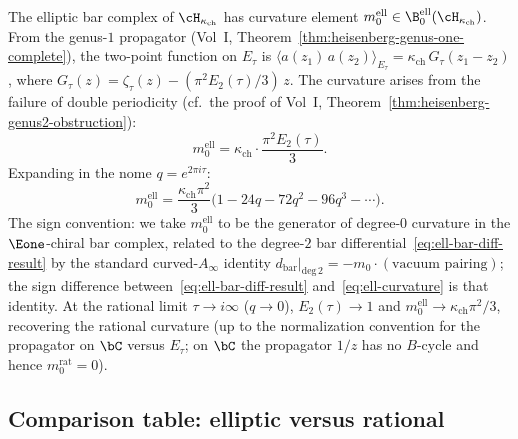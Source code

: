 \begin{computation}\label{comp:ell-curvature}
The elliptic bar complex of $\cH_{\kappa_{\mathrm{ch}}}$ has curvature
element $m_0^{\mathrm{ell}} \in \B^{\mathrm{ell}}_0(\cH_{\kappa_{\mathrm{ch}}})$.
From the genus-$1$ propagator
(Vol~I, Theorem~\ref{thm:heisenberg-genus-one-complete}), the
two-point function on $E_\tau$ is $\langle a(z_1)\,a(z_2)
\rangle_{E_\tau} = \kappa_{\mathrm{ch}}\,G_\tau(z_1 - z_2)$, where
$G_\tau(z) = \zeta_\tau(z) - (\pi^2 E_2(\tau)/3)\,z$.
The curvature arises from the failure of double periodicity
(cf.\ the proof of
Vol~I, Theorem~\ref{thm:heisenberg-genus2-obstruction}):
\begin{equation}\label{eq:ell-curvature}
m_0^{\mathrm{ell}}
= \kappa_{\mathrm{ch}} \cdot \frac{\pi^2 E_2(\tau)}{3}.
\end{equation}
Expanding in the nome $q = e^{2\pi i \tau}$:
\begin{equation}\label{eq:ell-curvature-q}
m_0^{\mathrm{ell}}
= \frac{\kappa_{\mathrm{ch}}\pi^2}{3}\bigl(
1 - 24q - 72q^2 - 96q^3 - \cdots
\bigr).
\end{equation}
The sign convention: we take $m_0^{\mathrm{ell}}$ to be the generator of degree-$0$ curvature in the $\Eone$-chiral bar complex, related to the degree-$2$ bar differential~\eqref{eq:ell-bar-diff-result} by the standard curved-$A_\infty$ identity $d_{\mathrm{bar}}|_{\mathrm{deg}\,2} = -m_0 \cdot (\text{vacuum pairing})$; the sign difference between~\eqref{eq:ell-bar-diff-result} and~\eqref{eq:ell-curvature} is that identity.
At the rational limit $\tau \to i\infty$ ($q \to 0$),
$E_2(\tau) \to 1$ and $m_0^{\mathrm{ell}} \to
\kappa_{\mathrm{ch}}\pi^2/3$, recovering the rational curvature
(up to the normalization convention for the propagator
on $\bC$ versus $E_\tau$; on $\bC$ the propagator
$1/z$ has no $B$-cycle and hence $m_0^{\mathrm{rat}} = 0$).
\end{computation}

\subsection{Comparison table: elliptic versus rational}
\label{subsec:ell-vs-rat-table}

